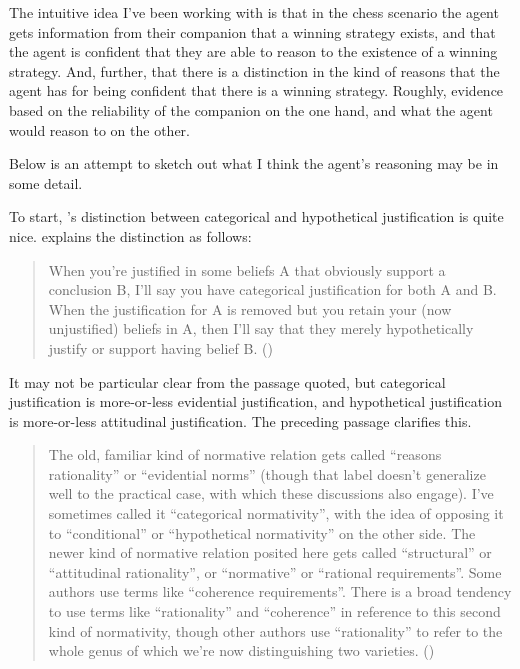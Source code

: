 \documentclass[10pt]{article}
\begin{document}
\begin{note}
  The intuitive idea I've been working with is that in the chess scenario the agent gets information from their companion that a winning strategy exists, and that the agent is confident that they are able to reason to the existence of a winning strategy.
  And, further, that there is a distinction in the kind of reasons that the agent has for being confident that there is a winning strategy.
  Roughly, evidence based on the reliability of the companion on the one hand, and what the agent would reason to on the other.

  Below is an attempt to sketch out what I think the agent's reasoning may be in some detail.
\end{note}

To start, \citeauthor{Pryor:2018aa}'s distinction between categorical and hypothetical justification is quite nice.
\citeauthor{Pryor:2018aa} explains the distinction as follows:

\begin{quote}
  When you're justified in some beliefs A that obviously support a conclusion B, I'll say you have categorical justification for both A and B.
  When the justification for A is removed but you retain your (now unjustified) beliefs in A, then I'll say that they merely hypothetically justify or support having belief B.\nolinebreak
  \mbox{}\hfill\mbox{(\citeauthor[126]{Pryor:2018aa})}
\end{quote}

It may not be particular clear from the passage quoted, but categorical justification is more-or-less evidential justification, and hypothetical justification is more-or-less attitudinal justification.
The preceding passage clarifies this.

\begin{quote}
  The old, familiar kind of normative relation gets called ``reasons rationality'' or ``evidential norms'' (though that label doesn’t generalize well to the practical case, with which these discussions also engage).
  I've sometimes called it ``categorical normativity'', with the idea of opposing it to ``conditional'' or ``hypothetical normativity'' on the other side.
  The newer kind of normative relation posited here gets called ``structural'' or ``attitudinal rationality'', or ``normative'' or ``rational requirements''.
  Some authors use terms like ``coherence requirements''.
  There is a broad tendency to use terms like ``rationality'' and ``coherence'' in reference to this second kind of normativity, though other authors use ``rationality'' to refer to the whole genus of which we’re now distinguishing two varieties.\nolinebreak
  \mbox{}\hfill\mbox{(\citeauthor[126]{Pryor:2018aa})}
\end{quote}
\end{document}
